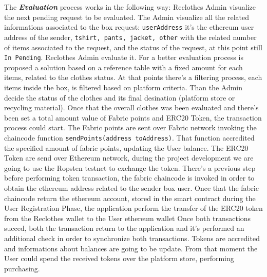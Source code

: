 \begin{outline}[enumerate]
    \1 The \textit{\bf{Evaluation}} process works in the following way:
    \2 Reclothes Admin visualize the next pending request to be evaluated. The Admin visualize all the related informations
    associated to the box request: \texttt{userAddress} it's the ethereum user address of the sender, 
    \texttt{tshirt, pants, jacket, other} with the related number of items associated to the request,
    and the status of the request, at this point still \texttt{In Pending}.
    \2 Reclothes Admin evaluate it. For a better evaluation process is proposed a solution based on
    a reference table with a fixed amount for each items, related to the clothes status. 
    At that points there's a filtering process, each items inside the box, is filtered based on 
    platform criteria. Than the Admin decide the status of the clothes and its final desination (platform store or recycling material).
    Once that the overall clothes was been evaluated and there's been set a total amount value 
    of Fabric points and ERC20 Token, the transaction process could start.
    \3 The Fabric points are sent over Fabric network invoking the chaincode function \texttt{sendPoints(address toAddress)}.
    That function accredited the specified amount of fabric points, updating the User balance. 
    \3 The ERC20 Token are send over Ethereum network, during the project development we are going to 
    use the Ropsten testnet to exchange the token. There's a previous step before performing
    token transaction, the fabric chaincode is invoked in order to obtain the ethereum address related to 
    the sender box user. Once that the fabric chaincode return the ethereum account, stored
    in the smart contract during the User Registration Phase, the application perform the transfer 
    of the ERC20 token from the Reclothes wallet to the User ethereum wallet
    \2 Once both transactions succed, both the transaction return to the application and it's performed
    an additional check in order to synchronize both transactions. Tokens are accredited and 
    informations about balances are going to be update. From that moment the User could spend the received
    tokens over the platform store, performing purchasing. 


\end{outline}

